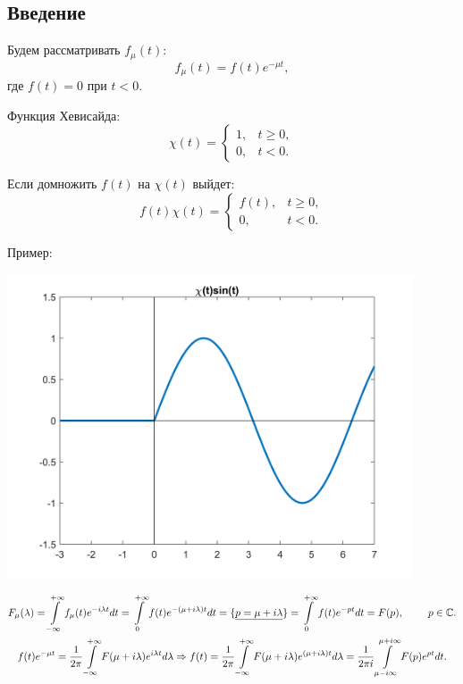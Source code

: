 \documentclass[oneside, final, 12pt]{article}
\theoremstyle{def}
\begin{document}
	\subsection{Введение}
	\begin{minipage}{0.4\textwidth}
		Будем рассматривать $f_{\mu}(t):$
		$$
	  		f_{\mu}(t)=f(t)e^{-\mu t}, 
		 $$
		где $f(t) = 0 \text{ при }  t<0$. \newline
		
		Функция Хевисайда: 
		$$\chi (t) = 	\begin{cases}
							1, & t \geqslant 0,\\	
							0, & t < 0.
						\end{cases}$$	
		
		
		Если домножить $f(t)$ на $\chi(t)$ выйдет: 
		$$
		  f(t)\chi(t) =
		  	\begin{cases}
		  		f(t), & t \geqslant 0 ,\\
		  		0, & t<0.
		  	\end{cases} 
		$$
	\end{minipage}
	\hfill
	\begin{minipage}{0.6\textwidth}
		\centering Пример: 
		
		\includegraphics[width=0.9\textwidth]{pict/hev_pict.png}
	\end{minipage} \newline
	
	$$
	\begin{gathered}
		\large F_{\mu}(\lambda) 	= \int\limits_{-\infty}^{+\infty}f_{\mu}(t)e^{-i\lambda t} dt 
											 	= \int\limits_{0}^{+\infty}f(t)e^{-(\mu+i\lambda) t} dt =
											 	\{ \underline{p = \mu +i\lambda}\} =
											 	 \int\limits_{0}^{+\infty}f(t)e^{-p t} dt = 
											 	 F(p), \qquad p \in \mathbb{C}. \\							 	
	 	f(t)e^{-\mu t} = \dfrac{1}{2\pi} \int\limits_{-\infty}^{+\infty} F(\mu+i\lambda)e^{i\lambda t} d \lambda
	 		 \Rightarrow 
	 		 	f(t) =  \dfrac{1}{2\pi} \int\limits_{-\infty}^{+\infty} F(\mu+i\lambda)e^{(\mu +i\lambda) t} d \lambda
	 		 		=   \dfrac{1}{2\pi i} \int\limits_{\mu-i\infty}^{\mu+i\infty} F(p)e^{pt} d t. \\
	 \end{gathered}
	$$
	
\end{document}
